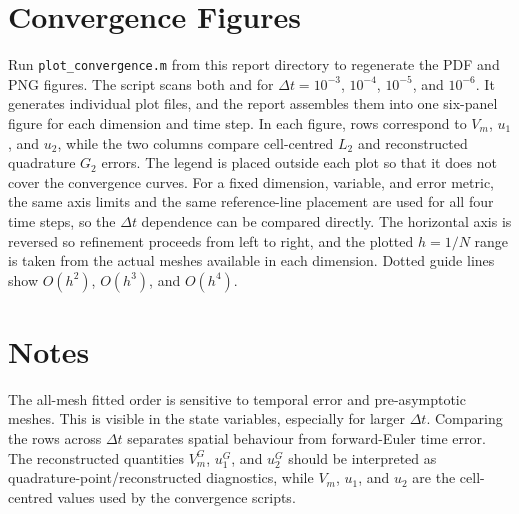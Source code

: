 \documentclass[11pt,a4paper]{article}
\newcommand{\code}[1]{\texttt{#1}}
\begin{document}
\section{Convergence Figures}
Run \code{plot\_convergence.m} from this report directory to regenerate the PDF and PNG figures. The script scans both  and  for $\Delta t=10^{-3}$, $10^{-4}$, $10^{-5}$, and $10^{-6}$. It generates individual plot files, and the report assembles them into one six-panel figure for each dimension and time step. In each figure, rows correspond to $V_m$, $u_1$, and $u_2$, while the two columns compare cell-centred $L_2$ and reconstructed quadrature $G_2$ errors. The legend is placed outside each plot so that it does not cover the convergence curves. For a fixed dimension, variable, and error metric, the same axis limits and the same reference-line placement are used for all four time steps, so the $\Delta t$ dependence can be compared directly. The horizontal axis is reversed so refinement proceeds from left to right, and the plotted $h=1/N$ range is taken from the actual meshes available in each dimension. Dotted guide lines show $O(h^2)$, $O(h^3)$, and $O(h^4)$.




\section{Notes}
The all-mesh fitted order is sensitive to temporal error and pre-asymptotic meshes. This is visible in the state variables, especially for larger $\Delta t$. Comparing the rows across $\Delta t$ separates spatial behaviour from forward-Euler time error. The reconstructed quantities $V_m^G$, $u_1^G$, and $u_2^G$ should be interpreted as quadrature-point/reconstructed diagnostics, while $V_m$, $u_1$, and $u_2$ are the cell-centred values used by the convergence scripts.
\end{document}
